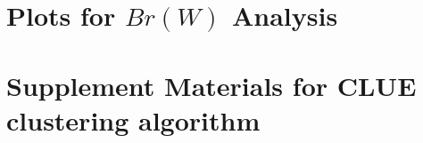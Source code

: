 
% 
% 






% 
% 
% 
% 
% 
% 
% 
% 






\chapter{Plots for $Br(W)$ Analysis}




\chapter{Supplement Materials for CLUE clustering algorithm}

